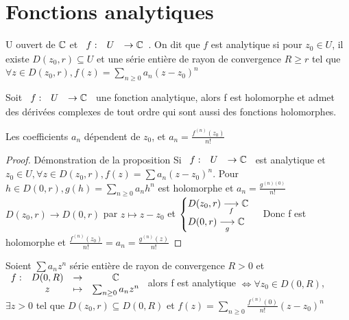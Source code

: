\documentclass[]{report}
\begin{document}
\section{Fonctions analytiques}

\begin{df}{}{}
    U ouvert de $\mathbb{C}$ et $\begin{array}{ccccc} f : & U & \to  \mathbb{C}\end{array}$. On dit que $f$ est analytique si pour $z_0 \in U$, il existe $D(z_0,r)\subseteq U$ et une série entière de rayon de convergence $R\ge r$ tel que $\forall z \in D(z_0,r),f(z)=\sum_{n\ge 0}a_n(z-z_0)^n$
\end{df}

\begin{prop}{}{}
    Soit $\begin{array}{ccccc} f : & U & \to  \mathbb{C}\end{array}$ une fonction analytique, alors f est holomorphe et admet des dérivées complexes de tout ordre qui sont aussi des fonctions holomorphes.
\end{prop}

\begin{re}{}{}
    Les coefficients $a_n$ dépendent de $z_0$, et $a_n=\frac{f^{(n)}(z_0)}{n!}$
\end{re}

\begin{proof}{Démonstration de la proposition}{}
    Si $\begin{array}{ccccc} f : & U & \to  \mathbb{C}\end{array}$ est analytique et $z_0\in U,\forall z \in D(z_0,r),f(z)=\sum a_n(z-z_0)^n$. Pour $h\in D(0,r),g(h)=\sum_{n\ge 0}a_nh^n$ est holomorphe et $a_n=\frac{g^{(n)(0)}}{n!}$\\
    $D(z_0,r){\longrightarrow} D(0,r)$ par $z\mapsto z-z_0$ et $\begin{cases}
        D(z_0,r)\underset{f}{\longrightarrow}\mathbb{C}\\
        D(0,r)\underset{g}{\longrightarrow}\mathbb{C}
    \end{cases}$ Donc f est holomorphe et $\frac{f^{(n)}(z_0)}{n!}=a_n=\frac{g^{(n)}(z)}{n!}$
\end{proof}

\begin{prop}{}{}
    Soient $\sum a_nz^n$ série entière de rayon de convergence $R>0$ et $\begin{array}{ccccc}
f : & D(0,R) & \to & \mathbb{C} \\
  & z & \mapsto & \sum_{n\ge0}a_nz^n
\end{array}$ alors f est analytique $\iff \forall z_0 \in D(0,R)$,
$\exists z>0$ tel que $D(z_0,r) \subseteq D(0,R)$ et
$f(z)=\sum_{n\ge0}\frac{f^{(n)}(0)}{n!}(z-z_0)^n$
\end{prop}
\end{document}
